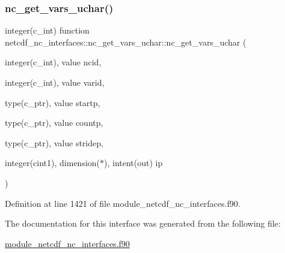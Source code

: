 \subsubsection{\texorpdfstring{nc\+\_\+get\+\_\+vars\+\_\+uchar()}{nc\_get\_vars\_uchar()}}
{\footnotesize\ttfamily integer(c\+\_\+int) function netcdf\+\_\+nc\+\_\+interfaces\+::nc\+\_\+get\+\_\+vars\+\_\+uchar\+::nc\+\_\+get\+\_\+vars\+\_\+uchar (\begin{DoxyParamCaption}\item[{integer(c\+\_\+int), value}]{ncid,  }\item[{integer(c\+\_\+int), value}]{varid,  }\item[{type(c\+\_\+ptr), value}]{startp,  }\item[{type(c\+\_\+ptr), value}]{countp,  }\item[{type(c\+\_\+ptr), value}]{stridep,  }\item[{integer(cint1), dimension($\ast$), intent(out)}]{ip }\end{DoxyParamCaption})}



Definition at line 1421 of file module\+\_\+netcdf\+\_\+nc\+\_\+interfaces.\+f90.



The documentation for this interface was generated from the following file\+:\begin{DoxyCompactItemize}
\item 
\hyperlink{module__netcdf__nc__interfaces_8f90}{module\+\_\+netcdf\+\_\+nc\+\_\+interfaces.\+f90}\end{DoxyCompactItemize}
